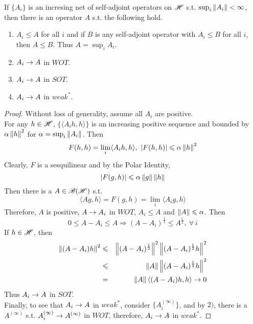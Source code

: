 \begin{prop}
	If $\{A_i\}$ is an incresing net of self-adjoint operators on $\mathscr{H}$ s.t. $\sup_i{\left\lVert A_i\right\lVert} < \infty$, then there is an operator $A$ s.t. the following hold.
	\begin{enumerate}[label = \arabic*)]
		\item $A_i \leqslant A$ for all $i$ and if $B$ is any self-adjoint operator with $A_i \leqslant B$ for all $i$, then $A \leqslant B$. Thus $A = \sup_i A_i$.
		\item $A_i \rightarrow A$ in $WOT$.
		\item $A_i \rightarrow A$ in $SOT$.
		\item $A_i \rightarrow A$ in $weak^{*}$.
	\end{enumerate}
\end{prop}
\begin{proof}
	Without loss of generality, assume all $A_i$ are positive.\\
	For any $h \in \mathscr{H}$, $\{\langle A_i h, h \rangle\}$ is an increasing positive sequence and bounded by $\alpha \left\lVert h\right\lVert^2$ for $\alpha = \sup_i{\left\lVert A_i\right\lVert}$. Then
	\begin{equation*}
		F(h,h) = \lim_i \langle A_i h, h \rangle,~ \left\lvert F(h,h)\right\lvert \leqslant \alpha \left\lVert h\right\lVert^2
	\end{equation*}
	Clearly, $F$ is a sesquilinear and by the Polar Identity, 
	\begin{equation*}
		\left\lvert F(g,h)\right\lvert \leqslant \alpha \left\lVert g\right\lVert \left\lVert h\right\lVert
	\end{equation*}
	Then there is a $A \in \mathscr{B(H)}$ s.t. 
	\begin{equation*}
		\langle Ag,h \rangle = F(g,h) = \lim_i \langle A_i g, h \rangle
	\end{equation*}
	Therefore, $A$ is positive, $A \rightarrow A_i$ in $WOT$, $A_i \leqslant A$ and $\left\lVert A\right\lVert \leqslant \alpha$. Then
	\begin{equation*}
		0 \leqslant A - A_i \leqslant A \Rightarrow (A-A_i)^{\frac{1}{2}} \leqslant A^{\frac{1}{2}},~ \forall~ i
	\end{equation*}
	If $h \in \mathscr{H}$, then
	\begin{eqnarray*}
		\left\lVert(A-A_i)h\right\lVert^2 &\leqslant& \left\lVert(A-A_i)^{\frac{1}{2}}\right\lVert^2 \left\lVert(A-A_i)^{\frac{1}{2}}h\right\lVert^2 \\
		&\leqslant& \left\lVert A\right\lVert \left\lVert(A-A_i)^{\frac{1}{2}}h\right\lVert^2 \\
		&=& \left\lVert A\right\lVert \langle (A-A_i)h,h  \rangle \rightarrow 0
	\end{eqnarray*}
	Thus $A_i \rightarrow A$ in $SOT$. \\
	Finally, to see that $A_i \rightarrow A$ in $weak^{*}$, consider $\{A_i^{(\infty)}\}$, and by $2)$, there is a $A^{(\infty)}$ s.t. $A_i^{(\infty)} \rightarrow A^{(\infty)}$ in $WOT$, therefore, $A_i \rightarrow A$ in $weak^{*}$.
\end{proof}

